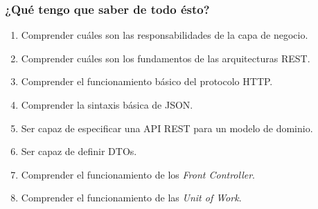 \documentclass[a4paper,slidestop,blue]{beamer}
\begin{document}
\begin{frame}[c]
    \frametitle{¿Qué tengo que saber de todo ésto?}
    \begin{enumerate}[<+->]
        \item Comprender cuáles son las responsabilidades de la capa de negocio.
        \item Comprender cuáles son los fundamentos de las arquitecturas REST.
        \item Comprender el funcionamiento básico del protocolo HTTP.
        \item Comprender la sintaxis básica de JSON.
        \item Ser capaz de especificar una API REST para un modelo de dominio.
        \item Ser capaz de definir DTOs.
        \item Comprender el funcionamiento de los \emph{Front Controller}.
        \item Comprender el funcionamiento de las \emph{Unit of Work}.
    \end{enumerate}
\end{frame}
\end{document}
